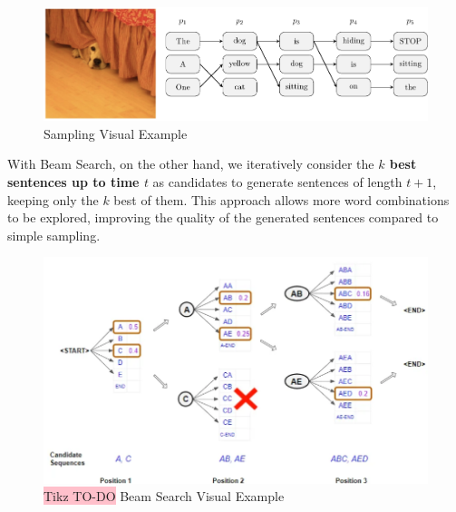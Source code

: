 \begin{figure}[!htbp]
    \centering
    \includegraphics[width=\linewidth]{tikz/chapter7 - Sampling.pdf}
    \caption{Sampling Visual Example}
\end{figure}

With Beam Search, on the other hand, we iteratively consider the \textbf{$k$ best sentences up to time $t$} as candidates to generate sentences of length $t+1$, keeping only the $k$ best of them. This approach allows more word combinations to be explored, improving the quality of the generated sentences compared to simple sampling.

\begin{figure}[!htbp]
    \centering
    \includegraphics[width=\linewidth]{tikz/chapter7 - Beam Search.png}
    \caption{{\color{red}\colorbox{pink}{Tikz TO-DO}} Beam Search Visual Example}
\end{figure}


